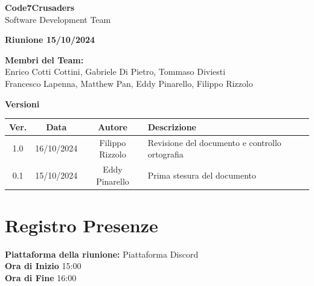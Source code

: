 \documentclass{article}
\begin{document}
\begin{titlepage}
    {\Huge \textbf{Code7Crusaders}}\\
    \vspace{0.5cm}
    {\Large Software Development Team}\\
    \vspace{2cm}
    
    {\large \textbf{Riunione 15/10/2024}}\\
    \vspace{5cm}

    \textbf{Membri del Team:}\\
    Enrico Cotti Cottini, Gabriele Di Pietro, Tommaso Diviesti \\
    Francesco Lapenna, Matthew Pan, Eddy Pinarello, Filippo Rizzolo \\
    \vspace{0.5cm}
      
    \vspace{1cm}
\end{titlepage}

\newpage
\begin{table}[h!]
\centering
\textbf{Versioni} \\ %
\vspace{2mm} %
\begin{tabular}{|c|c|c|l|}
    \hline
    \textbf{Ver.} & \textbf{Data} & \textbf{Autore} & \textbf{Descrizione} \\
    \hline
    1.0 & 16/10/2024 & Filippo Rizzolo & Revisione del documento e controllo ortografia \\ 
    \hline
    0.1 & 15/10/2024 & Eddy Pinarello & Prima stesura del documento \\ 
    \hline
\end{tabular}
\end{table}

\newpage
\tableofcontents
\newpage

\section{Registro Presenze}
\textbf{Piattaforma della riunione:} Piattaforma Discord \\
\textbf{Ora di Inizio} 15:00\\
\textbf{Ora di Fine} 16:00
\vspace{10mm} 
\end{document}
